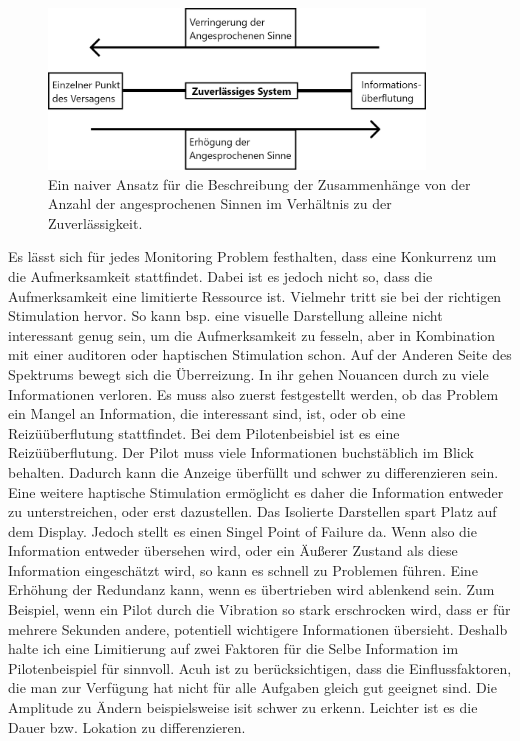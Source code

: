 \documentclass{llncs}					%
\begin{document}
\begin{figure}[htbp]
	\begin{center}
		\includegraphics[width = 10cm]{Grafiken/Sinne-Redundanz-Verhaeltnis.png}
		\caption{Ein naiver Ansatz für die Beschreibung der Zusammenhänge von der Anzahl der angesprochenen Sinnen im Verhältnis zu der Zuverlässigkeit.}
		\label{Sinne_Redundanz_Verhaeltnis}
	\end{center}
\end{figure}


Es lässt sich für jedes Monitoring Problem festhalten, dass eine Konkurrenz um die Aufmerksamkeit stattfindet. Dabei ist es jedoch nicht so, dass die Aufmerksamkeit eine limitierte Ressource ist. Vielmehr tritt sie bei der richtigen Stimulation hervor. So kann bsp. eine visuelle Darstellung alleine nicht interessant genug sein, um die Aufmerksamkeit zu fesseln, aber in Kombination mit einer auditoren oder haptischen Stimulation schon. Auf der Anderen Seite des Spektrums bewegt sich die Überreizung. In ihr gehen Nouancen durch zu viele Informationen verloren.
Es muss also zuerst festgestellt werden, ob das Problem ein Mangel an Information, die interessant sind, ist, oder ob eine Reizüüberflutung stattfindet. Bei dem Pilotenbeisbiel ist es eine Reizüüberflutung. Der Pilot muss viele Informationen buchstäblich im Blick behalten. Dadurch kann die Anzeige überfüllt und schwer zu differenzieren sein. Eine weitere haptische Stimulation ermöglicht es daher die Information entweder zu unterstreichen, oder erst dazustellen. Das Isolierte Darstellen spart Platz auf dem Display. Jedoch stellt es einen Singel Point of Failure da. Wenn also die Information entweder übersehen wird, oder ein Äußerer Zustand als diese Information eingeschätzt wird, so kann es schnell zu Problemen führen. Eine Erhöhung der Redundanz kann, wenn es übertrieben wird ablenkend sein. Zum Beispiel, wenn ein Pilot durch die Vibration so stark erschrocken wird, dass er für mehrere Sekunden andere, potentiell wichtigere Informationen übersieht. Deshalb halte ich eine Limitierung auf zwei Faktoren für die Selbe Information im Pilotenbeispiel für sinnvoll. Acuh ist zu berücksichtigen, dass die Einflussfaktoren, die man zur Verfügung hat nicht für alle Aufgaben gleich gut geeignet sind. Die Amplitude zu Ändern beispielsweise isit schwer zu erkenn. Leichter ist es die Dauer bzw. Lokation zu differenzieren.
\newpage
\end{document}
